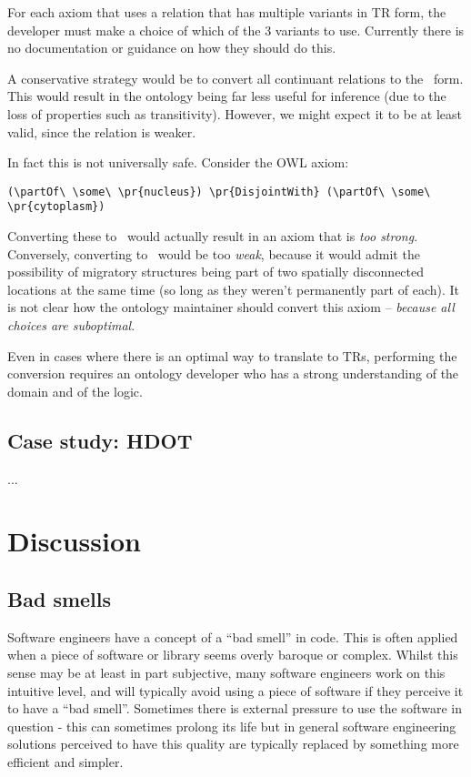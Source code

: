 \documentclass{bioinfo}
\def\partOf{\pr{part\_of}}
\def\atAllTimes{\pr{at-all-times}}
\def\atSomeTimes{\pr{at-some-times}}
\begin{document}
For each axiom that uses a relation that has multiple variants in TR
form, the developer must make a choice of which of the 3 variants to
use. Currently there is no documentation or guidance on how they
should do this.

A conservative strategy would be to convert all continuant relations
to the \atSomeTimes\ form. This would result in the ontology being far
less useful for inference (due to the loss of properties such as
transitivity). However, we might expect it to be at least valid, since
the relation is weaker.

In fact this is not universally safe. Consider the OWL axiom:

\begin{verbatim}
(\partOf\ \some\ \pr{nucleus}) \pr{DisjointWith} (\partOf\ \some\ \pr{cytoplasm})
\end{verbatim}

Converting these to \atSomeTimes\ would actually result in an axiom
that is \emph{too strong}. Conversely, converting to \atAllTimes\
would be too \emph{weak}, because it would admit the possibility of
migratory structures being part of two spatially disconnected
locations at the same time (so long as they weren't permanently part
of each). It is not clear how the ontology maintainer should convert
this axiom -- \emph{because all choices are suboptimal}.

Even in cases where there is an optimal way to translate to TRs,
performing the conversion requires an ontology developer who has a
strong understanding of the domain and of the logic.

\subsection{Case study: HDOT}

...

\section{Discussion}

\subsection{Bad smells}

Software engineers have a concept of a ``bad smell'' in code. This is
often applied when a piece of software or library seems overly baroque
or complex. Whilst this sense may be at least in part subjective, many
software engineers work on this intuitive level, and will typically
avoid using a piece of software if they perceive it to have a ``bad
smell''. Sometimes there is external pressure to use the software in
question - this can sometimes prolong its life but in general software
engineering solutions perceived to have this quality are typically
replaced by something more efficient and simpler.
\end{document}
